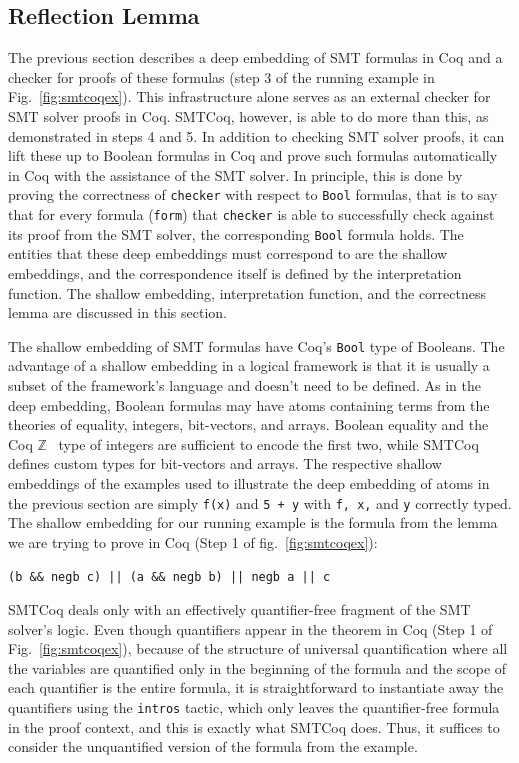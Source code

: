 \documentclass{article}
\begin{document}
	\subsection{Reflection Lemma}
	\label{sec:refl}
	The previous section describes a 
	deep embedding of SMT formulas 
	in Coq and a checker for 
	proofs of these formulas (step 3 of 
	the running example in 
	Fig.~\ref{fig:smtcoqex}). 
	This infrastructure alone serves 
	as an external checker for 
	SMT solver proofs in Coq.
	SMTCoq, however, is able to 
	do more than this, as demonstrated
	in steps 4 and 5. In addition 
	to checking SMT solver proofs, 
	it can lift these up to 
	Boolean formulas in Coq and
	prove such formulas automatically
	in Coq with the assistance of 
	the SMT solver. In principle,
	this is done by proving the
	correctness of \texttt{checker}
	with respect to \texttt{Bool}
	formulas, that is to say that 
	for every formula (\texttt{form})
	that \texttt{checker} is able to 
	successfully check against its
	proof from the SMT solver, the 
	corresponding \texttt{Bool}
	formula holds. The entities
	that these deep embeddings 
	must correspond to are the shallow
	embeddings, and the correspondence 
	itself is defined by the 
	interpretation function. The 
	shallow embedding, interpretation
	function, and the correctness 
	lemma are discussed in this 
	section.
	
	The shallow embedding of SMT formulas
	have Coq's \texttt{Bool} type of 
	Booleans. The advantage of a 
	shallow embedding in a logical 
	framework is that it is usually 
	a subset of the framework's language
	and doesn't need to be defined. 
	As in the deep embedding, Boolean
	formulas may have atoms containing 
	terms from the theories of 
	equality, integers, bit-vectors,
	and arrays. Boolean equality and
	the Coq $\mathbb{Z}$~\cite{CoqZ} type 
	of integers are sufficient to encode
	the first two, while SMTCoq 
	defines custom types for 
	bit-vectors and arrays. The
	respective shallow embeddings of
	the examples used to illustrate 
	the deep embedding of atoms in the 
	previous section are simply 
	\texttt{f(x)} and \texttt{5 + y} 
	with \texttt{f, x,} and \texttt{y}
	correctly typed. The shallow 
	embedding for our running example 
	is the formula from the lemma we 
	are trying to prove in Coq
	(Step 1 of fig.~\ref{fig:smtcoqex}):
	\begin{center}
		\texttt{(b \&\& negb c) || (a 
			\&\& negb b) || negb a || c}
	\end{center}	 
	SMTCoq deals only with an effectively 
	quantifier-free fragment of the SMT 
	solver's logic. Even though quantifiers 
	appear in the theorem in Coq (Step 1 of 
	Fig.~\ref{fig:smtcoqex}), because
	of the structure of universal 
	quantification where all the variables
	are quantified only in the beginning 
	of the formula and the scope of 
	each quantifier is the entire formula, 
	it is straightforward
	to instantiate away the quantifiers
	using the \texttt{intros} tactic, which 
	only leaves the quantifier-free 
	formula in the proof context, and this 
	is exactly what SMTCoq does. 
	Thus, it suffices to consider the 
	unquantified version of the 
	formula from the example.
	
\end{document}

